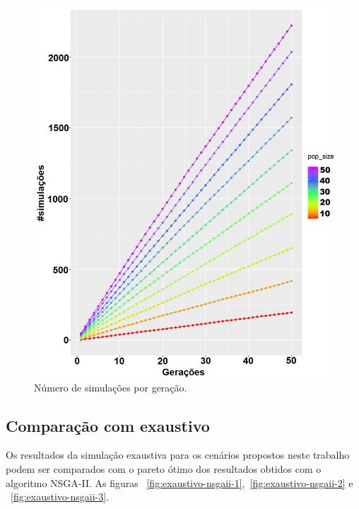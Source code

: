 \documentclass[conference]{IEEEtran}
\begin{document}
\begin{figure}[t]
  \centering
  \includegraphics[scale=0.24]{figures/SimulacoesPorGeracao.png}
  \caption{Número de simulações por geração.}
  \label{fig:result-sim}
\end{figure}

\subsection{Comparação com exaustivo}

Os resultados da simulação exaustiva para os cenários propostos neste trabalho podem ser comparados com o pareto ótimo dos resultados obtidos com o algoritmo NSGA-II. As figuras ~\ref{fig:exaustivo-nsgaii-1},~\ref{fig:exaustivo-nsgaii-2} e ~\ref{fig:exaustivo-nsgaii-3}.
\end{document}
